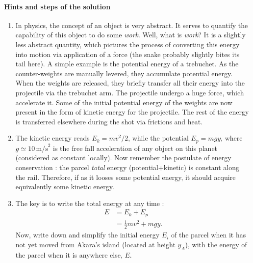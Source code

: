 \documentclass{article}
\begin{document}
\begin{tcolorbox}

\paragraph{Hints and steps of the solution}

\begin{enumerate}

\item In physics, the concept of an object  is very abstract. It serves to quantify the capability of this object to do some \textit{work}. Well, what is \textit{work}? It is a slightly less abstract quantity, which pictures the process of converting this energy into motion via application of a force (the snake probably slightly bites its tail here). A simple example is the potential energy of a trebuchet. As the counter-weights are manually levered, they accumulate potential energy. When the weights are released, they briefly transfer all their energy into the projectile via the trebuchet arm. The projectile undergo a huge force, which accelerate it. Some of the initial potential energy of the weights are now present in the form of kinetic energy for the projectile. The rest of the energy is transferred elsewhere during the shot via frictions and heat.

\item The kinetic energy reads $E_k=m v^2/2$, while the potential $E_p=m g y$, where $g\simeq 10 \,\text{m/s}^2$ is the free fall acceleration of any object on this planet (considered as constant locally). Now remember the postulate of energy conservation : the parcel \textit{total} energy (potential+kinetic) is constant along the rail. Therefore, if as it looses some potential energy, it should acquire equivalently some kinetic energy.



\item The key is to write the total energy at any time :
\begin{align}
E &= E_k + E_p\nonumber\\
&= \frac 12  mv^2 + m g y.\nonumber
\end{align}
Now, write down and simplify the initial energy $E_i$ of the parcel when it has not yet moved from Akara's island (located at height $y_A$), with the energy of the parcel when it is anywhere else, $E$.


\end{enumerate}
\end{tcolorbox}
\end{document}
